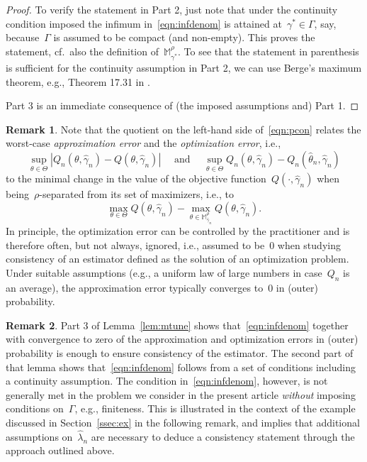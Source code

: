 \documentclass[11pt, a4paper]{article}
\theoremstyle{definition}
\newtheorem{remark}{Remark}[section]
\begin{document}
\begin{proof}
To verify the statement in Part 2, just note that under the continuity condition imposed the infimum in~\eqref{eqn:infdenom} is attained at~$\gamma^* \in \Gamma$, say, because~$\Gamma$ is assumed to be compact (and non-empty). This proves the statement, cf.~also the definition of~$\mathbb{M}_{\gamma^*}^{\rho}$. To see that the statement in parenthesis is sufficient for the continuity assumption in Part 2, we can use Berge's maximum theorem, e.g., Theorem 17.31 in \cite{hhg}. 

Part 3 is an immediate consequence of (the imposed assumptions and) Part 1.

\end{proof}


\begin{remark}
Note that the quotient on the left-hand side of~\eqref{eqn:pcon} relates the worst-case \emph{approximation error} and the \emph{optimization error}, i.e., $$\sup_{\theta \in \Theta} | Q_n(\theta, \hat{\gamma}_n) - Q(\theta, \hat{\gamma}_n) | \quad \text{ and } \quad \sup_{\theta \in \Theta} Q_n(\theta, \hat{\gamma}_n) - Q_n(\hat{\theta}_n, \hat{\gamma}_n)$$ to the minimal change in the value of the objective function~$Q(\cdot, \hat{\gamma}_n)$ when being~$\rho$-separated from its set of maximizers, i.e., to $$\max_{\theta \in \Theta} Q(\theta, \hat{\gamma}_n) - \max_{\theta \in \mathbb{M}_{\hat{\gamma}_n}^{\rho}} Q(\theta, \hat{\gamma}_n).$$  In principle, the optimization error can be controlled by the practitioner and is therefore often, but not always, ignored, i.e., assumed to be~$0$ when studying consistency of an estimator defined as the solution of an optimization problem. Under suitable assumptions (e.g., a uniform law of large numbers in case~$Q_n$ is an average), the approximation error typically converges to~$0$ in (outer) probability. 
\end{remark}

\begin{remark}
Part 3 of Lemma~\ref{lem:mtune} shows that~\eqref{eqn:infdenom} together with convergence to zero of the approximation and optimization errors in (outer) probability is enough to ensure consistency of the estimator. The second part of that lemma shows that~\eqref{eqn:infdenom} follows from a set of conditions  including a continuity assumption. The condition in~\eqref{eqn:infdenom}, however, is not generally met in the problem we consider in the present article \emph{without} imposing conditions on~$\Gamma$, e.g., finiteness. This is illustrated in the context of the example discussed in Section~\ref{ssec:ex} in the following remark, and implies that additional assumptions on~$\hat{\lambda}_n$ are necessary to deduce a consistency statement through the approach outlined above. 
\end{remark}
\end{document}
